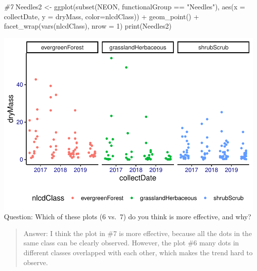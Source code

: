\documentclass[]{article}
\newenvironment{Shaded}{\begin{snugshade}}{\end{snugshade}}
\newcommand{\AttributeTok}[1]{\textcolor[rgb]{0.77,0.63,0.00}{#1}}
\newcommand{\CommentTok}[1]{\textcolor[rgb]{0.56,0.35,0.01}{\textit{#1}}}
\newcommand{\DecValTok}[1]{\textcolor[rgb]{0.00,0.00,0.81}{#1}}
\newcommand{\FunctionTok}[1]{\textcolor[rgb]{0.00,0.00,0.00}{#1}}
\newcommand{\NormalTok}[1]{#1}
\newcommand{\OtherTok}[1]{\textcolor[rgb]{0.56,0.35,0.01}{#1}}
\newcommand{\SpecialCharTok}[1]{\textcolor[rgb]{0.00,0.00,0.00}{#1}}
\newcommand{\StringTok}[1]{\textcolor[rgb]{0.31,0.60,0.02}{#1}}
\begin{document}
\begin{Shaded}
\begin{Highlighting}[]
\CommentTok{\#7}
\NormalTok{Needles2 }\OtherTok{\textless{}{-}}
  \FunctionTok{ggplot}\NormalTok{(}\FunctionTok{subset}\NormalTok{(NEON, functionalGroup }\SpecialCharTok{==} \StringTok{"Needles"}\NormalTok{), }
         \FunctionTok{aes}\NormalTok{(}\AttributeTok{x =}\NormalTok{ collectDate, }\AttributeTok{y =}\NormalTok{ dryMass, }\AttributeTok{color=}\NormalTok{nlcdClass)) }\SpecialCharTok{+}
  \FunctionTok{geom\_point}\NormalTok{() }\SpecialCharTok{+}
  \FunctionTok{facet\_wrap}\NormalTok{(}\FunctionTok{vars}\NormalTok{(nlcdClass), }\AttributeTok{nrow =} \DecValTok{1}\NormalTok{)}
\FunctionTok{print}\NormalTok{(Needles2)}
\end{Highlighting}
\end{Shaded}

\includegraphics{A05_DataVisualization_files/figure-latex/unnamed-chunk-6-2.pdf}
Question: Which of these plots (6 vs.~7) do you think is more effective,
and why?

\begin{quote}
Answer: I think the plot in \#7 is more effective, because all the dots
in the same class can be clearly observed. However, the plot \#6 many
dots in different classes overlapped with each other, which makes the
trend hard to observe.
\end{quote}
\end{document}
